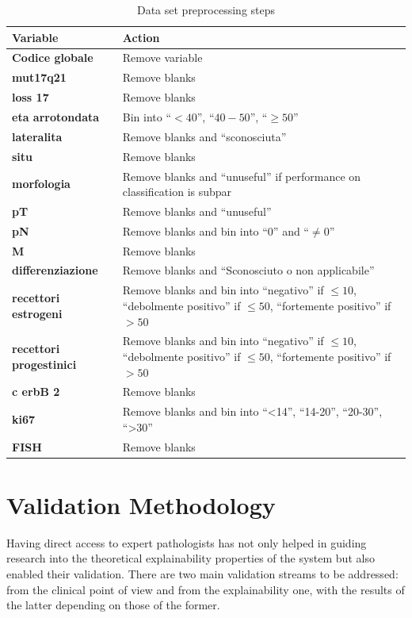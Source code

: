 \begin{table}[htbp]
\caption{Data set preprocessing steps}
\begin{tabularx}{\textwidth}{@{} l Y @{}}
\toprule 
\textbf{Variable} & Action \\
\midrule 
\textbf{Codice globale} & Remove variable \\
\textbf{mut17q21} & Remove blanks \\
\textbf{loss 17} & Remove blanks \\
\textbf{eta arrotondata} & Bin into \enquote{$< 40$}, \enquote{$40-50$}, \enquote{$\geq 50$} \\
\textbf{lateralita} & Remove blanks and \enquote{sconosciuta} \\
\textbf{situ} & Remove blanks \\ \addlinespace
\textbf{morfologia} & Remove blanks and \enquote{unuseful} if performance on classification is subpar \\ \addlinespace
\textbf{pT} & Remove blanks and \enquote{unuseful}  \\
\textbf{pN} & Remove blanks and bin into \enquote{0} and \enquote{$\neq0$}\\
\textbf{M} & Remove blanks \\ 
\textbf{differenziazione} & Remove blanks and \enquote{Sconosciuto o non applicabile} \\ \addlinespace
\textbf{recettori estrogeni} & Remove blanks and bin into \enquote{negativo} if $\leq 10$,
		\enquote{debolmente positivo} if $\leq 50$, 
		\enquote{fortemente positivo} if $> 50$ \\ \addlinespace
\textbf{recettori progestinici} & Remove blanks and bin into \enquote{negativo} if $\leq 10$, 
		\enquote{debolmente positivo} if $\leq 50$, 
		\enquote{fortemente positivo} if $> 50$ \\ \addlinespace
\textbf{c erbB 2} & Remove blanks \\ 
\textbf{ki67} & Remove blanks and bin into \enquote{<14}, 
		\enquote{14-20}, \enquote{20-30}, \enquote{>30} \\ 
\textbf{FISH} & Remove blanks \\
\bottomrule
\end{tabularx}
\label{tab:datasetpreprocess}
\end{table}

\section{Validation Methodology}
Having direct access to expert pathologists has not only helped in guiding research into the theoretical explainability properties of the system but also enabled their validation.
There are two main validation streams to be addressed: from the clinical point of view and from the explainability one, with the results of the latter depending on those of the former.
 
